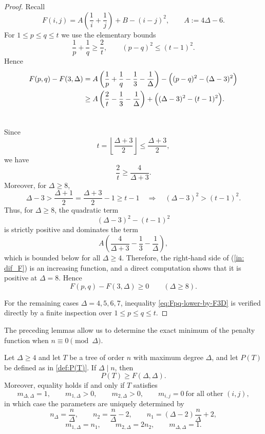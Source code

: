 \documentclass[preprint,12pt]{elsarticle}
\begin{document}
\begin{proof}
Recall
\[
F(i,j)=A\left(\frac1i+\frac1j\right)+B-(i-j)^2,
\qquad
A:=4\Delta-6.
\]
For $1\le p\le q\le t$ we use the elementary bounds
\[
\frac1p+\frac1q \ge \frac{2}{t},
\qquad
(p-q)^2\le (t-1)^2.
\]
Hence
\begin{eqnarray}
\label{in: dif_F}
F(p,q)-F(3,\Delta)
&=A\left(\frac1p+\frac1q-\frac13-\frac1\Delta\right)
-\Bigl((p-q)^2-(\Delta-3)^2\Bigr) \nonumber\\
&\ge A\left(\frac{2}{t}-\frac13-\frac1\Delta\right)
+\Bigl((\Delta-3)^2-(t-1)^2\Bigr).\\\nonumber
\end{eqnarray}


Since
\[
t=\left\lfloor\frac{\Delta+3}{2}\right\rfloor \le \frac{\Delta+3}{2},
\]
we have
\[
\frac{2}{t}\ge \frac{4}{\Delta+3}.
\]
Moreover, for $\Delta\ge 8$,
\[
\Delta-3>\frac{\Delta+1}{2}=\frac{\Delta+3}{2}-1\geq t-1
\quad\Longrightarrow\quad
(\Delta-3)^2>(t-1)^2.
\]
Thus, for $\Delta\ge 8$, the quadratic term
\[
(\Delta-3)^2-(t-1)^2
\]
is strictly positive and dominates the term
\[
A\left(\frac{4}{\Delta+3}-\frac13-\frac1\Delta\right),
\]
which is bounded below for all $\Delta\ge 4$. 
Therefore, the right-hand side of (\ref{in: dif_F})  is an increasing function, and a direct computation shows that it is positive at $\Delta =8$.
Hence
\[
F(p,q)-F(3,\Delta)\ge 0 \qquad (\Delta\ge 8).
\]

For the remaining cases $\Delta=4,5,6,7$, inequality
\eqref{eq:Fpq-lower-by-F3D} is verified directly by a finite inspection over
$1\le p\le q\le t$.
\end{proof}








The preceding lemmas allow us to determine the exact minimum of the penalty function when $n\equiv0\pmod{\Delta}$.







\begin{theorem}
\label{thm:Pmin-n0modDelta}
Let $\Delta\ge 4$ and let $T$ be a tree of order $n$ with maximum degree $\Delta$,
and let $P(T)$ be defined as in \eqref{def:P(T)}.
If $\Delta\mid n$, then
\[
P(T)\ge F(\Delta,\Delta).
\]
Moreover, equality holds if and only if $T$ satisfies
\[
m_{\Delta,\Delta}=1,\qquad
m_{1,\Delta}>0,\qquad
m_{2,\Delta}>0,\qquad
m_{i,j}=0\ \text{for all other }(i,j),
\]
in which case the parameters are uniquely determined by
\[
n_\Delta=\frac{n}{\Delta},\qquad
n_2=\frac{n}{\Delta}-2,\qquad
n_1=(\Delta-2)\frac{n}{\Delta}+2,
\]
\[
m_{1,\Delta}=n_1,\qquad
m_{2,\Delta}=2n_2,\qquad
m_{\Delta,\Delta}=1.
\]
\end{theorem}
\end{document}
